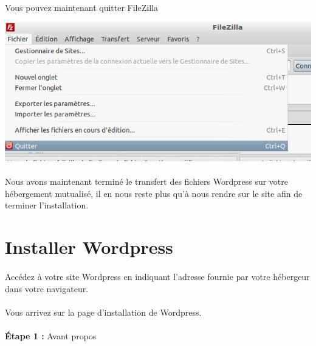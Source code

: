 \documentclass[10pt,a4paper]{article}
\begin{document}
\paragraph{}Vous pouvez maintenant quitter FileZilla
\begin{center}
\includegraphics[scale=0.35]{img/0039.png}
\end{center}
\paragraph{}Nous avons maintenant terminé le transfert des fichiers Wordpress sur votre hébergement mutualisé, il en nous reste plus qu'à nous rendre sur le site afin de terminer l'installation.
\newpage

\section{Installer Wordpress}
\paragraph{}Accédez à votre site Wordpress en indiquant l'adresse fournie par votre hébergeur dans votre navigateur.
\paragraph{}Vous arrivez sur la page d'installation de Wordpress.
\paragraph{}\textbf{Étape 1 : }Avant propos
\end{document}
